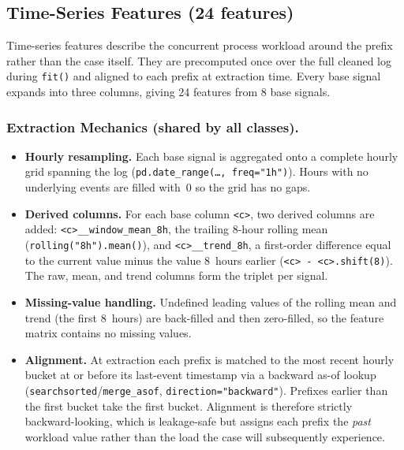 \documentclass[runningheads]{llncs}
\begin{document}
\subsection{Time-Series Features (24 features)}

Time-series features describe the concurrent process workload around the prefix
rather than the case itself. They are precomputed once over the full cleaned
log during \texttt{fit()} and aligned to each prefix at extraction time. Every
base signal expands into three columns, giving 24 features from 8 base signals.

\subsubsection{Extraction Mechanics (shared by all classes).}
\begin{itemize}
    \item \textbf{Hourly resampling.} Each base signal is aggregated onto a
          complete hourly grid spanning the log
          (\texttt{pd.date\_range(\dots, freq="1h")}). Hours with no underlying
          events are filled with~0 so the grid has no gaps.
    \item \textbf{Derived columns.} For each base column \texttt{<c>}, two
          derived columns are added: \texttt{<c>\_\_window\_mean\_8h}, the
          trailing 8-hour rolling mean (\texttt{rolling("8h").mean()}), and
          \texttt{<c>\_\_trend\_8h}, a first-order difference equal to the
          current value minus the value 8~hours earlier
          (\texttt{<c> - <c>.shift(8)}). The raw, mean, and trend columns form
          the triplet per signal.
    \item \textbf{Missing-value handling.} Undefined leading values of the
          rolling mean and trend (the first 8~hours) are back-filled and then
          zero-filled, so the feature matrix contains no missing values.
    \item \textbf{Alignment.} At extraction each prefix is matched to the most
          recent hourly bucket at or before its last-event timestamp via a
          backward as-of lookup (\texttt{searchsorted}/\texttt{merge\_asof},
          \texttt{direction="backward"}). Prefixes earlier than the first
          bucket take the first bucket. Alignment is therefore strictly
          backward-looking, which is leakage-safe but assigns each prefix the
          \emph{past} workload value rather than the load the case will
          subsequently experience.
\end{itemize}
\end{document}
